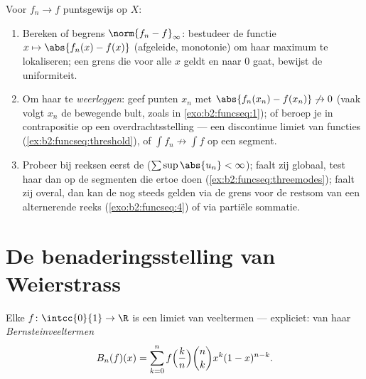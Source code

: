 \begin{method}\label{met:b2:funcseq:uniform}
Voor $f_n \to f$ puntsgewijs op $X$:
\begin{enumerate}
  \item Bereken of begrens $\norm{f_n - f}_\infty$: bestudeer de
        functie $x \mapsto \abs{f_n(x) - f(x)}$ (afgeleide,
        monotonie) om haar maximum te lokaliseren; een grens die
        voor alle $x$ geldt en naar $0$ gaat, bewijst de
        uniformiteit.
  \item Om haar te \emph{weerleggen}: geef punten $x_n$ met
        $\abs{f_n(x_n) - f(x_n)} \not\to 0$ (vaak volgt $x_n$ de
        bewegende bult, zoals in \cref{exo:b2:funcseq:1}); of
        beroep je in contrapositie op een overdrachtsstelling ---
        een discontinue limiet van  functies
        (\cref{ex:b2:funcseq:threshold}), of $\int f_n \not\to
        \int f$ op een segment.
  \item Probeer bij reeksen eerst de 
        ($\sum\sup\abs{u_n} < \infty$); faalt zij globaal, test
        haar dan op de segmenten die ertoe doen
        (\cref{ex:b2:funcseq:threemodes}); faalt zij overal, dan
        kan de  nog steeds gelden via de
        grens voor de restsom van een alternerende reeks
        (\cref{exo:b2:funcseq:4}) of via partiële sommatie.
\end{enumerate}
\end{method}

\section{De benaderingsstelling van Weierstrass}

\begin{theorem}\label{thm:b2:funcseq:weierstrass}
Elke  $f \colon \intcc{0}{1} \to \R$ is een  limiet
van veeltermen --- expliciet: van haar
\emph{Bernsteinveeltermen}
\[
B_n(f)(x) = \sum_{k=0}^{n} f\Bigl(\frac kn\Bigr)\binom nk x^k
(1-x)^{n-k} .
\]
\end{theorem}

